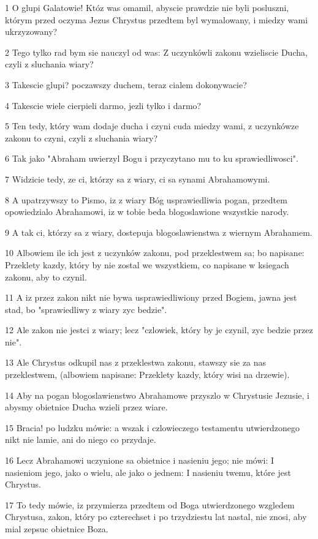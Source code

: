 \par 1 O glupi Galatowie! Któz was omamil, abyscie prawdzie nie byli posluszni, którym przed oczyma Jezus Chrystus przedtem byl wymalowany, i miedzy wami ukrzyzowany?
\par 2 Tego tylko rad bym sie nauczyl od was: Z uczynkówli zakonu wzieliscie Ducha, czyli z sluchania wiary?
\par 3 Takescie glupi? poczawszy duchem, teraz cialem dokonywacie?
\par 4 Takescie wiele cierpieli darmo, jezli tylko i darmo?
\par 5 Ten tedy, który wam dodaje ducha i czyni cuda miedzy wami, z uczynkówze zakonu to czyni, czyli z sluchania wiary?
\par 6 Tak jako "Abraham uwierzyl Bogu i przyczytano mu to ku sprawiedliwosci".
\par 7 Widzicie tedy, ze ci, którzy sa z wiary, ci sa synami Abrahamowymi.
\par 8 A upatrzywszy to Pismo, iz z wiary Bóg usprawiedliwia pogan, przedtem opowiedzialo Abrahamowi, iz w tobie beda blogoslawione wszystkie narody.
\par 9 A tak ci, którzy sa z wiary, dostepuja blogoslawienstwa z wiernym Abrahamem.
\par 10 Albowiem ile ich jest z uczynków zakonu, pod przeklestwem sa; bo napisane: Przeklety kazdy, który by nie zostal we wszystkiem, co napisane w ksiegach zakonu, aby to czynil.
\par 11 A iz przez zakon nikt nie bywa usprawiedliwiony przed Bogiem, jawna jest stad, bo "sprawiedliwy z wiary zyc bedzie".
\par 12 Ale zakon nie jestci z wiary; lecz "czlowiek, który by je czynil, zyc bedzie przez nie".
\par 13 Ale Chrystus odkupil nas z przeklestwa zakonu, stawszy sie za nas przeklestwem, (albowiem napisane: Przeklety kazdy, który wisi na drzewie).
\par 14 Aby na pogan blogoslawienstwo Abrahamowe przyszlo w Chrystusie Jezusie, i abysmy obietnice Ducha wzieli przez wiare.
\par 15 Bracia! po ludzku mówie: a wszak i czlowieczego testamentu utwierdzonego nikt nie lamie, ani do niego co przydaje.
\par 16 Lecz Abrahamowi uczynione sa obietnice i nasieniu jego; nie mówi: I nasieniom jego, jako o wielu, ale jako o jednem: I nasieniu twemu, które jest Chrystus.
\par 17 To tedy mówie, iz przymierza przedtem od Boga utwierdzonego wzgledem Chrystusa, zakon, który po czterechset i po trzydziestu lat nastal, nie znosi, aby mial zepsuc obietnice Boza.
